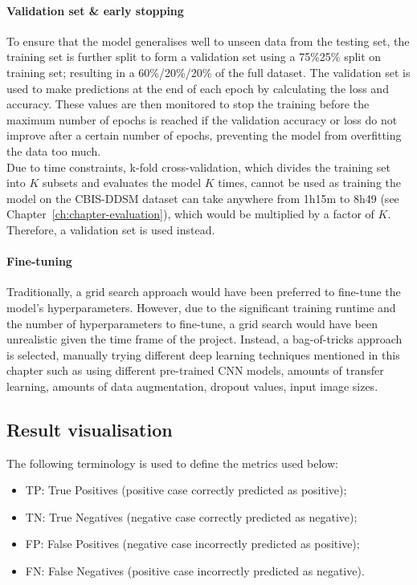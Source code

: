 \paragraph{Validation set \& early stopping}

To ensure that the model generalises well to unseen  data from the testing set, the training set is further split to form a validation set using a 75\%25\% split on training set; resulting in a 60\%/20\%/20\% of the full dataset. The validation set is used to make predictions at the end of each epoch by calculating the loss and accuracy. These values are then monitored to stop the training before the maximum number of epochs is reached if the validation accuracy or loss do not improve after a certain number of epochs, preventing the model from overfitting the data too much.\\

Due to time constraints, k-fold cross-validation, which divides the training set into $K$ subsets and evaluates the model $K$ times, cannot be used as training the model on the CBIS-DDSM dataset can take anywhere from 1h15m to 8h49 (see Chapter~\ref{ch:chapter-evaluation}), which would be multiplied by a factor of $K$. Therefore, a validation set is used instead.

\paragraph{Fine-tuning}

Traditionally, a grid search approach would have been preferred to fine-tune the model's hyperparameters. However, due to the significant training runtime and the number of hyperparameters to fine-tune, a grid search would have been unrealistic given the time frame of the project. Instead, a bag-of-tricks approach is selected, manually trying different deep learning techniques mentioned in this chapter such as using different pre-trained CNN models, amounts of transfer learning, amounts of data augmentation, dropout values, input image sizes.


\subsection{Result visualisation}
\label{sec:design-results-visualisation}

The following terminology is used to define the metrics used below:
\begin{itemize}
    \item TP: True Positives (positive case correctly predicted as positive);
    \item TN: True Negatives (negative case correctly predicted as negative);
    \item FP: False Positives (negative case incorrectly predicted as positive);
    \item FN: False Negatives (positive case incorrectly predicted as negative).
\end{itemize}

